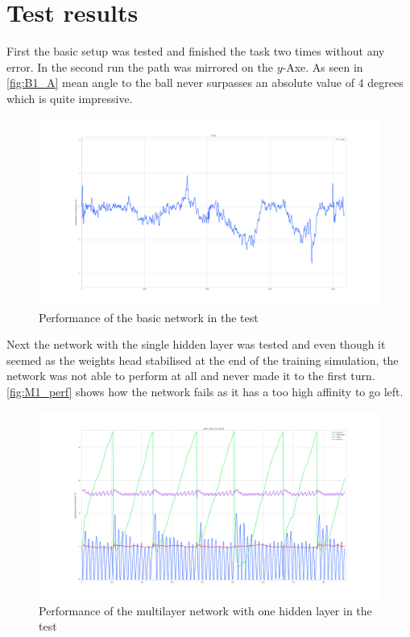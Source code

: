 \section{Test results}
First the basic setup was tested and finished the task two times without any error. In the second run the path was mirrored on the $y$-Axe. As seen in \autoref{fig:B1_A} mean angle to the ball never surpasses an absolute value of $4$ degrees which is quite impressive.
\newline
\begin{figure}[htpb]
  \centering
  \includegraphics[width=\textwidth]{figures/plots/B1_A}
  \caption{ Performance of the basic network in the test }
  \label{fig:B1_A}
\end{figure}
Next the network with the single hidden layer was tested and even though it seemed as the weights head stabilised at the end of the training simulation, the network was not able to perform at all and never made it to the first turn. \autoref{fig:M1_perf} shows how the network fails as it has a too high affinity to go left.
\begin{figure}[htpb]
  \centering
  \includegraphics[width=\textwidth]{figures/plots/M1_perf}
  \caption{ Performance of the multilayer network with one hidden layer in the test }
  \label{fig:M1_perf}
\end{figure}
